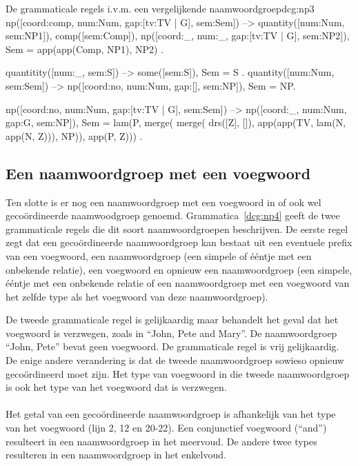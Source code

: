 \begin{dcg}{De grammaticale regels i.v.m. een vergelijkende naamwoordgroep}{dcg:np3}
np([coord:comp, num:Num, gap:[tv:TV | G], sem:Sem]) -->
  quantity([num:Num, sem:NP1]),
  comp([sem:Comp]),
  np([coord:_, num:_, gap:[tv:TV | G], sem:NP2]),
  { Sem = app(app(Comp, NP1), NP2) }.

quantitity([num:_, sem:S]) -->
  some([sem:S]),
  { Sem = S }.
quantity([num:Num, sem:Sem]) -->
  np([coord:no, num:Num, gap:[], sem:NP]),
  { Sem = NP}.

np([coord:no, num:Num, gap:[tv:TV | G], sem:Sem]) -->
  np([coord:_, num:Num, gap:G, sem:NP]),
  { Sem = lam(P, merge(
      merge(
        drs([Z], []),
        app(app(TV, lam(N, app(N, Z))), NP)),
      app(P, Z))) }.
\end{dcg}

\subsection{Een naamwoordgroep met een voegwoord}
Ten slotte is er nog een naamwoordgroep met een voegwoord in of ook wel gecoördineerde naamwoodgroep genoemd. Grammatica~\ref{dcg:np4} geeft de twee grammaticale regels die dit soort naamwoordgroepen beschrijven. De eerste regel zegt dat een gecoördineerde naamwoordgroep kan bestaat uit een eventuele prefix van een voegwoord, een naamwoordgroep (een simpele of ééntje met een onbekende relatie), een voegwoord en opnieuw een naamwoordgroep (een simpele, ééntje met een onbekende relatie of een naamwoordgroep met een voegwoord van het zelfde type als het voegwoord van deze naamwoordgroep).

De tweede grammaticale regel is gelijkaardig maar behandelt het geval dat het voegwoord is verzwegen, zoals in ``John, Pete and Mary''. De naamwoordgroep ``John, Pete'' bevat geen voegwoord. De grammaticale regel is vrij gelijkaardig. De enige andere verandering is dat de tweede naamwoordgroep sowieso opnieuw gecoördineerd moet zijn. Het type van voegwoord in die tweede naamwoordgroep is ook het type van het voegwoord dat is verzwegen.

\paragraph{} Het getal van een gecoördineerde naamwoordgroep is afhankelijk van het type van het voegwoord (lijn 2, 12 en 20-22). Een conjunctief voegwoord (``and'') resulteert in een naamwoordgroep in het meervoud. De andere twee types resulteren in een naamwoordgroep in het enkelvoud.

